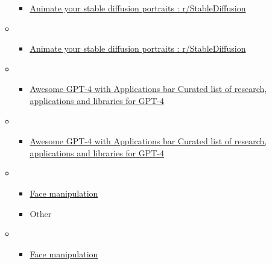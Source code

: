 \begin{itemize}
\begin{itemize}
\begin{itemize}
    \item
      \href{https://www.reddit.com/r/StableDiffusion/comments/11qexu0/animate_your_stable_diffusion_portraits/\#}{Animate
      your stable diffusion portraits : r/StableDiffusion}
    \end{itemize}
  \item
    \begin{itemize}
     
    \item
      \href{https://www.reddit.com/r/StableDiffusion/comments/11qexu0/animate_your_stable_diffusion_portraits/\#}{Animate
      your stable diffusion portraits : r/StableDiffusion}
    \end{itemize}
  \item
    \begin{itemize}
     
    \item
      \href{https://github.com/dk-liang/Awesome-GPT-4-with-Applications}{Awesome
      GPT-4 with Applications bar{} Curated list of research,
      applications and libraries for GPT-4}
    \end{itemize}
  \item
    \begin{itemize}
     
    \item
      \href{https://github.com/dk-liang/Awesome-GPT-4-with-Applications}{Awesome
      GPT-4 with Applications bar{} Curated list of research,
      applications and libraries for GPT-4}
    \end{itemize}
  \item
    \begin{itemize}
     
    \item
      \href{https://buff.ly/3laNpgY}{Face manipulation}
    \end{itemize}

    \begin{itemize}
     
    \item
      Other
    \end{itemize}
  \item
    \begin{itemize}
     
    \item
      \href{https://buff.ly/3laNpgY}{Face manipulation}
    \end{itemize}

    \begin{itemize}
     

\end{itemize}
\end{itemize}
\end{itemize}
